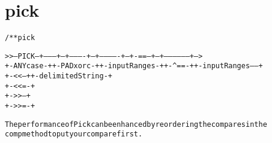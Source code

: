 \section{pick}
\begin{shaded}
\begin{alltt}
/** pick

 >>--PICK--+---------+--+----------+--+-------------+--+-==--+--+-----------------+-->
           +-ANYcase-+  +-PAD xorc-+  +-inputRanges-+  +-^==-+  +-inputRanges-----+
                                                       +-<<--+  +-delimitedString-+
                                                       +-<<=-+
                                                       +->>--+
                                                       +->>=-+

  The performance of Pick can be enhanced by reordering the compares in the
  comp method to put your compare first.

\end{alltt}
\end{shaded}
